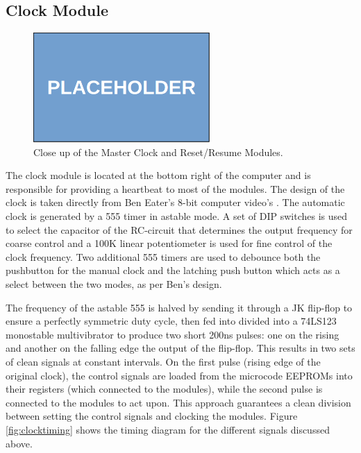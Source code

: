 \subsection{Clock Module} \label{sec:clock}
\begin{figure}[H]
  \centering
  \includegraphics[width=0.6\textwidth]{img/placeholder}
  \caption{Close up of the Master Clock and Reset/Resume Modules.}
  \label{fig:masterclockcloseup}
\end{figure}

The clock module is located at the bottom right of the computer and is responsible for providing a heartbeat to most of the modules. The design of the clock is taken directly from Ben Eater's 8-bit computer video's \cite{beneater}. The automatic clock is generated by a 555 timer in astable mode. A set of DIP switches is used to select the capacitor of the RC-circuit that determines the output frequency for coarse control and a 100K linear potentiometer is used for fine control of the clock frequency. Two additional 555 timers are used to debounce both the pushbutton for the manual clock and the latching push button which acts as a select between the two modes, as per Ben's design. 

The frequency of the astable 555 is halved by sending it through a JK flip-flop to ensure a perfectly symmetric duty cycle, then fed into divided into a 74LS123 monostable multivibrator to produce two short 200ns pulses: one on the rising and another on the falling edge the output of the flip-flop. This results in two sets of clean signals at constant intervals. On the first pulse (rising edge of the original clock), the control signals are loaded from the microcode EEPROMs into their registers (which connected to the modules), while the second pulse is connected to the modules to act upon. This approach guarantees a clean division between setting the control signals and clocking the modules. Figure \ref{fig:clocktiming} shows the timing diagram for the different signals discussed above.

